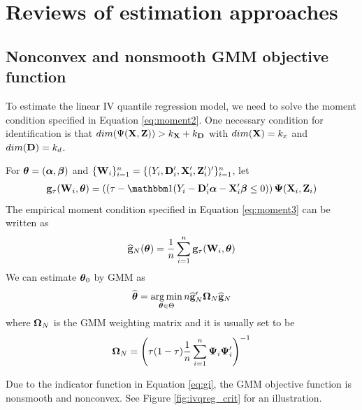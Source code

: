 \section{Reviews of estimation approaches} \label{sec:rev}

\subsection{Nonconvex and nonsmooth GMM objective function}	
To estimate the linear IV quantile regression model, we need to solve the moment
condition specified in Equation \ref{eq:moment2}.  One necessary condition for
identification is that $dim(\Psi(\mathbf{X}, \mathbf{Z})) > k_{\mathbf{X}} + k_{\mathbf{D}}$ with $dim(\mathbf{X}) =
k_x$  and $dim(\mathbf{D}) = k_d$.

For $\boldsymbol{\theta} = (\boldsymbol{\alpha}, \boldsymbol{\beta})$ and $\{\mathbf{W}_i\}_{i=1}^n = \{(Y_i, \mathbf{D}_i',
\mathbf{X}_i', \mathbf{Z}_i')'\}_{i=1}^n$, let
\begin{align}
\gb_\tau(\Wb_i, \thetab) = (
\left( \tau - \I (Y_i  - \Db_i'\alphab - \Xb_i'\betab \leq 0)  \right)
\Psib(\Xb_i, \Zb_i)
\label{eq:gi}
\end{align}
The empirical moment condition specified in Equation \ref{eq:moment3} can be
written as
\begin{align}
\widehat{\mathbf{g}}_N(\boldsymbol{\theta}) = \frac{1}{n}\sum_{i=1}^n \mathbf{g}_\tau(\mathbf{W}_i, \boldsymbol{\theta})
\end{align}
We can estimate $\boldsymbol{\theta}_0$ by GMM as
\begin{align}
\widehat{\boldsymbol{\theta}} = \operatorname*{arg\,min}_{\boldsymbol{\theta} \in \Theta} n \widehat{\mathbf{g}}_N' \boldsymbol{\Omega}_N
\widehat{\mathbf{g}}_N
\label{eq:gmm_original}
\end{align}
where $\boldsymbol{\Omega}_N$ is the GMM weighting matrix and it is usually set to be
\begin{align}
\boldsymbol{\Omega}_N = \left(
	\tau(1-\tau) \frac{1}{n}\sum_{i=1}^n\boldsymbol{\Psi}_i \boldsymbol{\Psi}_i'
\right)^{-1}
\end{align}

Due to the indicator function in Equation \ref{eq:gi}, the GMM objective
function is nonsmooth and nonconvex. See Figure \ref{fig:ivqreg_crit} for an
illustration. 

